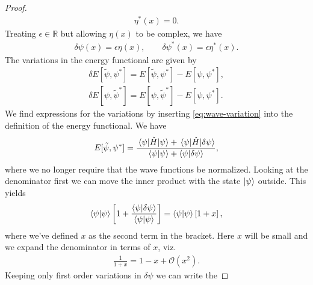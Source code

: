 \begin{proof}
\begin{gather}
{                }
                \eta^{*}(x)
                = 0.
            \end{gather}
            Treating $\epsilon \in \mathbb{R}$ but allowing $\eta(x)$ to be
            complex, we have
            \begin{gather}
                \delta\psi(x) = \epsilon\eta(x),
                \qquad
                \delta\psi^{*}(x) = \epsilon\eta^{*}(x).
            \end{gather}
            The variations in the energy functional are given by
            \begin{gather}
                \delta E[\tilde{\psi}, \psi^{*}]
                = E[\tilde{\psi}, \psi^{*}]
                - E[\psi, \psi^{*}], \\
                \delta E[\psi, \tilde{\psi}^{*}]
                = E[\psi, \tilde{\psi}^{*}]
                - E[\psi, \psi^{*}].
            \end{gather}
            We find expressions for the variations by inserting
            \autoref{eq:wave-variation} into the definition of the energy
            functional.
            We have
            \begin{align}
                E[\tilde{\psi}, \psi^{*}]
                = \frac{
                    \mel{\psi}{\hat{H}}{\psi}
                    + \mel{\psi}{\hat{H}}{\delta\psi}
                }{
                    \braket{\psi}
                    + \braket{\psi}{\delta\psi}
                },
            \end{align}
            where we no longer require that the wave functions be normalized.
            Looking at the denominator first we can move the inner product with
            the state $\ket{\psi}$ outside.
            This yields
            \begin{align}
                \braket{\psi}\left[ 
                    1 +
                    \frac{
                        \braket{\psi}{\delta\psi}
                    }{
                        \braket{\psi}
                    }
                 \right]
                = \braket{\psi}\left[ 1 + x \right],
            \end{align}
            where we've defined $x$ as the second term in the bracket.
            Here $x$ will be small and we expand the denominator in terms of
            $x$, viz.
            \begin{align}
                \frac{1}{1 + x} = 1 - x + \mathcal{O}(x^2).
            \end{align}
            Keeping only first order variations in $\delta\psi$ we can write the

\end{proof}
